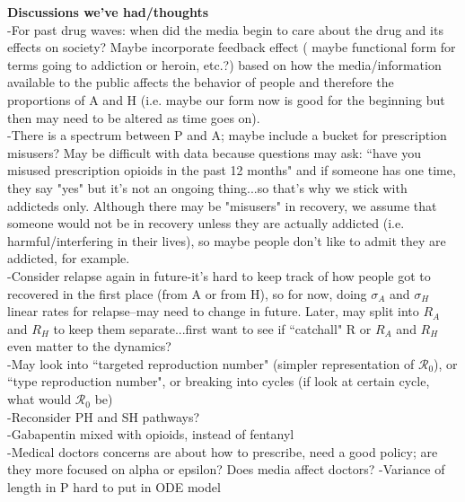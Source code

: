 \documentclass[12pt]{article}
\begin{document}



\textbf{Discussions we've had/thoughts} \\
-For past drug waves: when did the media begin to care about the drug and its effects on society? Maybe incorporate feedback effect ( maybe functional form for terms going to addiction or heroin, etc.?) based on how the media/information available to the public affects the behavior of people and therefore the proportions of A and H (i.e. maybe our form now is good for the beginning but then may need to be altered as time goes on).\\
-There is a spectrum between P and A; maybe include a bucket for prescription misusers? May be difficult with data because questions may ask: ``have you misused prescription opioids in the past 12 months" and if someone has one time, they say "yes" but it's not an ongoing thing...so that's why we stick with addicteds only. Although there may be "misusers" in recovery, we assume that someone would not be in recovery unless they are actually addicted (i.e. harmful/interfering in their lives), so maybe people don't like to admit they are addicted, for example.\\
-Consider relapse again in future-it's hard to keep track of how people got to recovered in the first place (from A or from H), so for now, doing $\sigma_A$ and $\sigma_H$ linear rates for relapse--may need to change in future. Later, may split into $R_A$ and $R_H$ to keep them separate...first want to see if ``catchall" R or $R_A$ and $R_H$ even matter to the dynamics?\\
-May look into ``targeted reproduction number" (simpler representation of $\mathscr{R}_0$), or ``type reproduction number", or breaking into cycles (if look at certain cycle, what would $\mathscr{R}_0$ be)\\
-Reconsider PH and SH pathways? \\
-Gabapentin mixed with opioids, instead of fentanyl \\
-Medical doctors concerns are about how to prescribe, need a good policy; are they more focused on alpha or epsilon? Does media affect doctors? 
-Variance of length in P hard to put in ODE model \\
\\ \\
\end{document}

